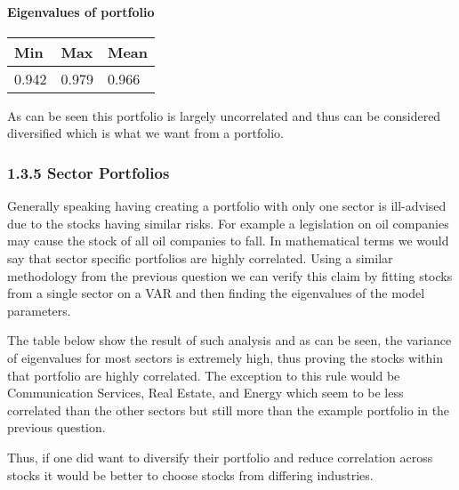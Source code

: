 \documentclass[11pt]{article}
\begin{document}
\hypertarget{eigenvalues-of-portfolio}{%
\paragraph{Eigenvalues of portfolio}\label{eigenvalues-of-portfolio}}

\begin{longtable}[]{@{}lll@{}}
\toprule
Min & Max & Mean\tabularnewline
\midrule
\endhead
0.942 & 0.979 & 0.966\tabularnewline
\bottomrule
\end{longtable}

As can be seen this portfolio is largely uncorrelated and thus can be
considered diversified which is what we want from a portfolio.

    \hypertarget{sector-portfolios}{%
\subsubsection{1.3.5 Sector Portfolios}\label{sector-portfolios}}

Generally speaking having creating a portfolio with only one sector is
ill-advised due to the stocks having similar risks. For example a
legislation on oil companies may cause the stock of all oil companies to
fall. In mathematical terms we would say that sector specific portfolios
are highly correlated. Using a similar methodology from the previous
question we can verify this claim by fitting stocks from a single
sector on a VAR and then finding the eigenvalues of the model
parameters.

The table below show the result of such analysis and as can be seen,
the variance of eigenvalues for most sectors is extremely high, thus
proving the stocks within that portfolio are highly correlated. The
exception to this rule would be Communication Services, Real Estate, and
Energy which seem to be less correlated than the other sectors but still
more than the example portfolio in the previous question.

Thus, if one did want to diversify their portfolio and reduce
correlation across stocks it would be better to choose stocks from
differing industries.
\end{document}
